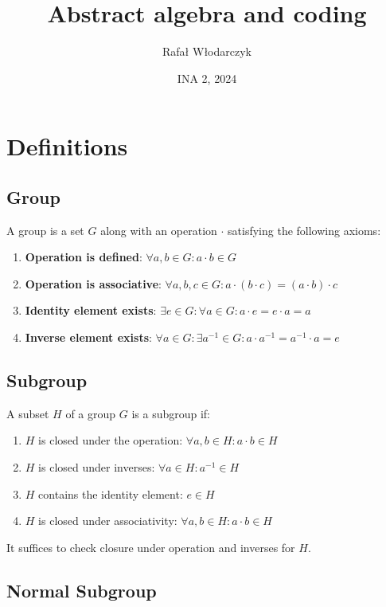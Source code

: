 \documentclass{article}
\title{Abstract algebra and coding}
\author{Rafał Włodarczyk}
\date{INA 2, 2024}
\begin{document}
\maketitle

\tableofcontents

\section{Definitions}

\subsection{Group}

A group is a set \( G \) along with an operation \( \cdot \) satisfying the following axioms:
\begin{enumerate}
    \item \textbf{Operation is defined}: \( \forall a, b \in G: a \cdot b \in G \)
    \item \textbf{Operation is associative}: \( \forall a, b, c \in G: a \cdot (b \cdot c) = (a \cdot b) \cdot c \)
    \item \textbf{Identity element exists}: \( \exists e \in G: \forall a \in G: a \cdot e = e \cdot a = a \)
    \item \textbf{Inverse element exists}: \( \forall a \in G: \exists a^{-1} \in G: a \cdot a^{-1} = a^{-1} \cdot a = e \)
\end{enumerate}

\subsection{Subgroup}

A subset \( H \) of a group \( G \) is a subgroup if:
\begin{enumerate}
    \item \( H \) is closed under the operation: \( \forall a, b \in H: a \cdot b \in H \)
    \item \( H \) is closed under inverses: \( \forall a \in H: a^{-1} \in H \)
    \item \( H \) contains the identity element: \( e \in H \)
    \item \( H \) is closed under associativity: \( \forall a, b \in H: a \cdot b \in H \)
\end{enumerate}

It suffices to check closure under operation and inverses for \( H \).

\subsection{Normal Subgroup}
\end{document}
